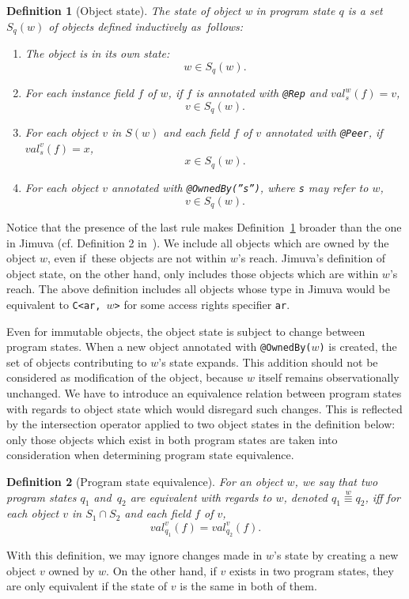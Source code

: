 \documentclass{pracamgr}
\theoremstyle{break}
\newtheorem{defi}{Definition}
\theoremstyle{break}
\theoremstyle{break}
\begin{document}
\begin{defi}[Object state]
  \label{def:state}
  The \emph{state of object w} in program state $q$ is a set $S_q(w)$
  of objects defined inductively as~follows:
  \begin{enumerate}[label=(\arabic*)]
  \item The object is in its own state: 
    $$w \in S_q(w).$$
  \item For each instance field $f$ of $w$, if $f$ is annotated with
    \texttt{@Rep} and $val_s^w(f) = v$,
    $$v \in S_q(w).$$
  \item For each object $v$ in $S(w)$ and each field $f$ of $v$
    annotated with \texttt{@Peer}, if $val_s^v(f) = x$, 
    $$ x \in S_q(w).$$
  \item For each object $v$ annotated with \texttt{@OwnedBy(''s'')},
    where \texttt{s} may refer to $w$,
    $$v \in S_q(w).$$
  \end{enumerate}
\end{defi}
Notice that the presence of the last rule makes
Definition~\ref{def:state} broader than the one in Jimuva
(cf. Definition 2 in~\cite{haack}). We include all objects which are
owned by the object $w$, even if~these objects are not within $w$'s
reach. Jimuva's definition of object state, on the other hand, only
includes those objects which are within $w$'s reach. The above
definition includes all objects whose type in Jimuva would be
equivalent to \texttt{C<ar, }$w$\texttt{>} for some access rights
specifier \texttt{ar}.

Even for immutable objects, the object state is subject to change
between program states. When a new object annotated with
\texttt{@OwnedBy($w$)} is created, the set of objects contributing to
$w$'s state expands. This addition should not be considered as
modification of the object, because $w$ itself remains observationally
unchanged. We have to introduce an equivalence relation between
program states with regards to object state which would disregard such
changes. This is reflected by the intersection operator applied to two
object states in the definition below: only those objects which exist
in both program states are taken into consideration when determining
program state equivalence.

\begin{defi}[Program state equivalence]
  For an object $w$, we say that two program states $q_1$ and~$q_2$
  are \emph{equivalent with regards to $w$}, denoted $q_1
  \stackrel{w}{\equiv} q_2$, iff for each object $v$ in $S_1 \cap S_2$
  and each field $f$ of $v$,
  $$val_{q_1}^{v}(f) = val_{q_2}^{v}(f).$$
\end{defi}
With this definition, we may ignore changes made in $w$'s state by
creating a new object $v$ owned by $w$. On the other hand, if $v$
exists in two program states, they are only equivalent if the state of
$v$ is the same in both of them.
\end{document}
